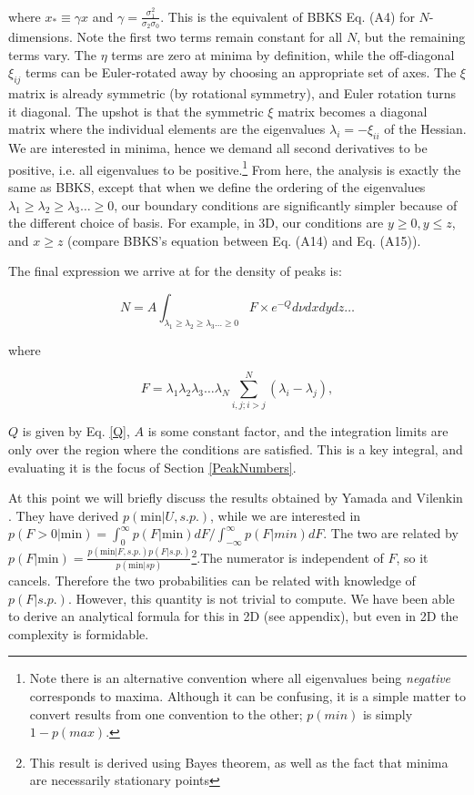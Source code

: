 \documentclass[12pt]{article}
\begin{document}
\noindent where $x_* \equiv \gamma x$ and $\gamma = \frac{\sigma_1^2}{\sigma_2 \sigma_0}$. This is the equivalent of BBKS Eq. (A4) for $N$-dimensions. Note the first two terms remain constant for all $N$, but the remaining terms vary. The $\eta$ terms are zero at minima by definition, while the off-diagonal $\xi_{ij}$ terms can be Euler-rotated away by choosing an appropriate set of axes. The $\xi$ matrix is already symmetric (by rotational symmetry), and Euler rotation turns it diagonal.\cite{Goldstein} The upshot is that the symmetric $\xi$ matrix becomes a diagonal matrix where the individual elements are the eigenvalues $\lambda_i = -\xi_{ii}$ of the Hessian. We are interested in minima, hence we demand all second derivatives to be positive, i.e. all eigenvalues to be positive.\footnote{Note there is an alternative convention where all eigenvalues being \emph{negative} corresponds to maxima. Although it can be confusing, it is a simple matter to convert results from one convention to the other; $p(min)$ is simply $1-p(max)$.} From here, the analysis is exactly the same as BBKS, except that when we define the ordering of the eigenvalues $\lambda_1 \geq \lambda_2 \geq \lambda_3 \ldots \geq 0$, our boundary conditions are significantly simpler because of the different choice of basis. For example, in 3D, our conditions are $y \geq 0, y \leq z$, and $x \geq z$ (compare BBKS's equation between Eq. (A14) and Eq. (A15)).

The final expression we arrive at for the density of peaks is:

\begin{equation} \label{DensityOfPeaks}
N = A \int_{\lambda_1 \geq \lambda_2 \geq \lambda_3 \ldots \geq 0} F \times e^{-Q} d\nu dx dy dz \ldots
\end{equation}

\noindent where

\begin{equation}
F = \lambda_1\lambda_2\lambda_3\ldots\lambda_N \sum^N_{i,j; i>j} (\lambda_i - \lambda_j),
\end{equation}

\noindent $Q$ is given by Eq. \ref{Q}, $A$ is some constant factor, and the integration limits are only over the region where the conditions are satisfied. This is a key integral, and evaluating it is the focus of Section \ref{PeakNumbers}.

At this point we will briefly discuss the results obtained by Yamada and Vilenkin \cite{Yamada2018}. They have derived $p(\mathrm{min}|U, s.p.)$, while we are interested in $p(F>0|\mathrm{min})=\int^\infty_0 p(F|\mathrm{min})dF/\int^\infty_{-\infty} p(F|min)dF$. The two are related by $p(F|\mathrm{min})= \frac{p(\mathrm{min}|F, s.p.)p(F|s.p.)}{p(\mathrm{min}|sp)}$\footnote{This result is derived using Bayes theorem, as well as the fact that minima are necessarily stationary points}.The numerator is independent of $F$, so it cancels. Therefore the two probabilities can be related with knowledge of $p(F|s.p.)$. However, this quantity is not trivial to compute. We have been able to derive an analytical formula for this in 2D (see appendix), but even in 2D the complexity is formidable.
\end{document}
